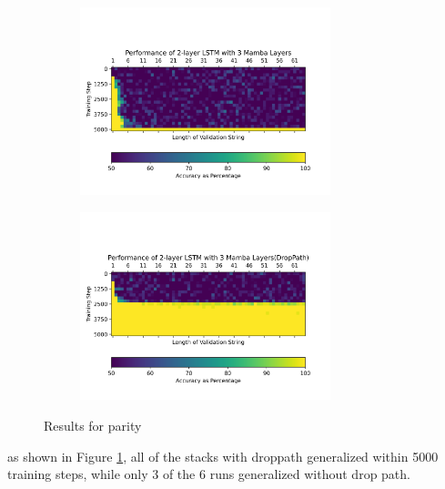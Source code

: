 \begin{figure}
\begin{subfigure}{0.5\textwidth}
\begin{center}
        \includegraphics[width=0.8\textwidth]{figures/parity_lstm_False_5_2.png}
        \end{center}
    \end{subfigure}\begin{subfigure}{0.5\textwidth}
        \begin{center}
        \includegraphics[width=0.8\textwidth]{figures/parity_lstm_True_5_2.png}
        \end{center}
    \end{subfigure}
    \caption{Results for parity}
    \label{droppathresults}
\end{figure}
as shown in Figure \ref{droppathresults}, all of the stacks with droppath
generalized within 5000 training steps, while only 3 of the 6 runs generalized
without drop path.

